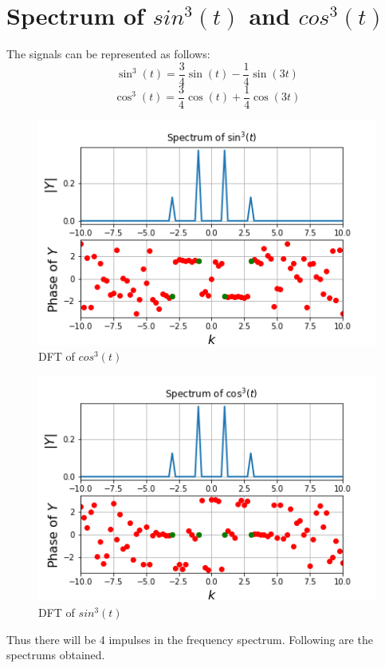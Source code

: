 \documentclass[11pt, a4paper]{article}
\begin{document}
\section{Spectrum of $sin^3(t)$ and $cos^3(t)$}
The signals can be represented as follows:
\begin{equation}
\sin^3(t) = \frac{3}{4}\sin(t) - \frac{1}{4}\sin(3t)
\end{equation}
\begin{equation}
\cos^3(t) = \frac{3}{4}\cos(t) + \frac{1}{4}\cos(3t)
\end{equation}
\begin{figure}[!tbh]
   	\centering
   	\includegraphics[scale=0.8]{fig3.png}  %
   	\caption{DFT of $cos^3(t)$}
   	\label{fig:sample}
   \end{figure} 
 \begin{figure}[!tbh]
   	\centering
   	\includegraphics[scale=0.8]{fig4.png}  %
   	\caption{DFT of $sin^3(t)$}
   	\label{fig:sample}
   \end{figure} 
Thus there will be 4 impulses in the frequency spectrum. Following are the spectrums obtained.
\end{document}
